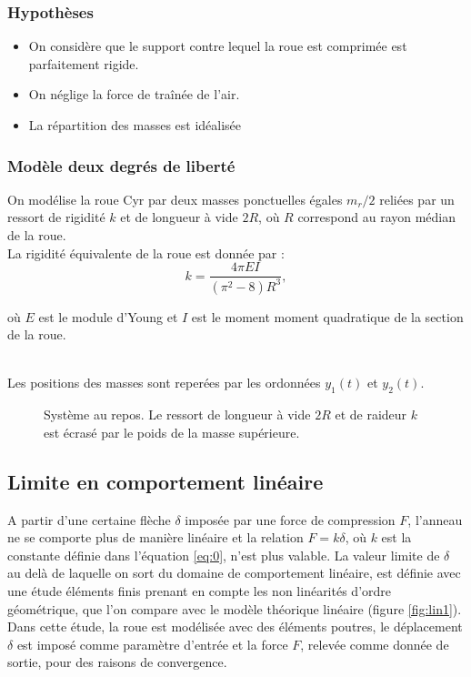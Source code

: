 \subsubsection{Hypothèses}
\begin{itemize}
    \item On considère que le support contre lequel la roue est comprimée est parfaitement rigide.
    \item On néglige la force de traînée de l'air.
    \item La répartition des masses est idéalisée
\end{itemize}

\subsubsection{Modèle deux degrés de liberté}
On modélise la roue Cyr par deux masses ponctuelles égales $m_r/2$ reliées par un ressort de rigidité $k$ et de longueur à vide $2R$, où $R$ correspond au rayon médian de la roue. \\
La rigidité équivalente de la roue est donnée par \cite{yangkim}:
\begin{equation}
    k=\frac{4\pi EI}{(\pi^2 -8)R^3},
    \label{eq:0}
\end{equation}

où $E$ est le module d'Young et $I$ est le moment moment quadratique de la section de la roue.

\\
 Les positions des masses sont reperées par les ordonnées $y_1(t)$ et $y_2(t)$.

\begin{figure}[htb]
\centering


\caption{Système au repos. Le ressort de longueur à vide $2R$ et de raideur $k$ est écrasé par le poids de la masse supérieure.}
\label{fig:repos}
\end{figure}

\subsection{Limite en comportement linéaire}

A partir d'une certaine flèche $\delta$ imposée par une force de compression $F$, l'anneau ne se comporte plus de manière linéaire et la relation $F=k\delta$, où $k$ est la constante définie dans l'équation \ref{eq:0}, n'est plus valable. 
La valeur limite de $\delta$ au delà de laquelle on sort du domaine de comportement linéaire, est définie avec une étude éléments finis prenant en compte les non linéarités d'ordre géométrique, que l'on compare avec le modèle théorique linéaire (figure \ref{fig:lin1}). Dans cette étude, la roue est modélisée avec des éléments poutres, le déplacement $\delta$ est imposé comme paramètre d'entrée et la force $F$, relevée comme donnée de sortie, pour des raisons de convergence.

